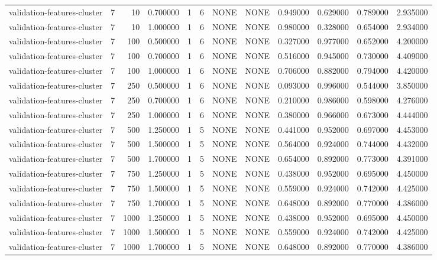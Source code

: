 \begin{tabular}{lrrrllllrrrr}
validation-features-cluster & 7 & 10 & 0.700000 & 1 & 6 & NONE & NONE & 0.949000 & 0.629000 & 0.789000 & 2.935000 \\
validation-features-cluster & 7 & 10 & 1.000000 & 1 & 6 & NONE & NONE & 0.980000 & 0.328000 & 0.654000 & 2.934000 \\
validation-features-cluster & 7 & 100 & 0.500000 & 1 & 6 & NONE & NONE & 0.327000 & 0.977000 & 0.652000 & 4.200000 \\
validation-features-cluster & 7 & 100 & 0.700000 & 1 & 6 & NONE & NONE & 0.516000 & 0.945000 & 0.730000 & 4.409000 \\
validation-features-cluster & 7 & 100 & 1.000000 & 1 & 6 & NONE & NONE & 0.706000 & 0.882000 & 0.794000 & 4.420000 \\
validation-features-cluster & 7 & 250 & 0.500000 & 1 & 6 & NONE & NONE & 0.093000 & 0.996000 & 0.544000 & 3.850000 \\
validation-features-cluster & 7 & 250 & 0.700000 & 1 & 6 & NONE & NONE & 0.210000 & 0.986000 & 0.598000 & 4.276000 \\
validation-features-cluster & 7 & 250 & 1.000000 & 1 & 6 & NONE & NONE & 0.380000 & 0.966000 & 0.673000 & 4.444000 \\
validation-features-cluster & 7 & 500 & 1.250000 & 1 & 5 & NONE & NONE & 0.441000 & 0.952000 & 0.697000 & 4.453000 \\
validation-features-cluster & 7 & 500 & 1.500000 & 1 & 5 & NONE & NONE & 0.564000 & 0.924000 & 0.744000 & 4.432000 \\
validation-features-cluster & 7 & 500 & 1.700000 & 1 & 5 & NONE & NONE & 0.654000 & 0.892000 & 0.773000 & 4.391000 \\
validation-features-cluster & 7 & 750 & 1.250000 & 1 & 5 & NONE & NONE & 0.438000 & 0.952000 & 0.695000 & 4.450000 \\
validation-features-cluster & 7 & 750 & 1.500000 & 1 & 5 & NONE & NONE & 0.559000 & 0.924000 & 0.742000 & 4.425000 \\
validation-features-cluster & 7 & 750 & 1.700000 & 1 & 5 & NONE & NONE & 0.648000 & 0.892000 & 0.770000 & 4.386000 \\
validation-features-cluster & 7 & 1000 & 1.250000 & 1 & 5 & NONE & NONE & 0.438000 & 0.952000 & 0.695000 & 4.450000 \\
validation-features-cluster & 7 & 1000 & 1.500000 & 1 & 5 & NONE & NONE & 0.559000 & 0.924000 & 0.742000 & 4.425000 \\
validation-features-cluster & 7 & 1000 & 1.700000 & 1 & 5 & NONE & NONE & 0.648000 & 0.892000 & 0.770000 & 4.386000 \\

\end{tabular}
